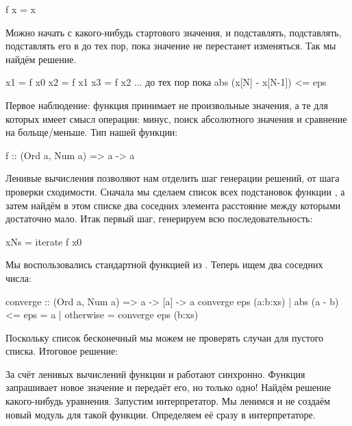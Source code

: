 \begin{code}
f x = x
\end{code}

Можно начать с какого-нибудь стартового значения, и подставлять,
подставлять, подставлять его в  до тех пор, пока значение
не перестанет изменяться. Так мы найдём решение. 

\begin{code}
x1 = f x0
x2 = f x1
x3 = f x2
...
до тех пор пока abs (x[N] - x[N-1]) <= eps
\end{code}

Первое наблюдение: функция принимает не произвольные значения,
а те для которых имеет смысл операции: минус, поиск абсолютного
значения и сравнение на больще/меньше. Тип нашей функции:

\begin{code}
f :: (Ord a, Num a) => a -> a
\end{code}

Ленивые вычисления позволяют нам отделить шаг генерации
решений, от шага проверки сходимости. Сначала мы сделаем
список всех подстановок функции , а затем найдём
в этом списке два соседних элемента расстояние между которыми 
достаточно мало. Итак первый шаг, генерируем всю
последовательность:

\begin{code}
xNs = iterate f x0
\end{code}

Мы воспользовались стандартной функцией  из
. Теперь ищем два соседних числа:


\begin{code}
converge :: (Ord a, Num a) => a -> [a] -> a
converge eps (a:b:xs) 
    | abs (a - b) <= eps    = a
    | otherwise             = converge eps (b:xs)
\end{code}

Поскольку список бесконечный мы можем не проверять
случаи для пустого списка. Итоговое решение:


За счёт ленивых вычислений функции
 и  работают синхронно.
Функция  запрашивает новое значение
и  передаёт его, но только одно!
Найдём решение какого-нибудь уравнения. Запустим интерпретатор.
Мы ленимся и не создаём новый модуль для такой 
функции. Определяем её сразу в интерпретаторе.


